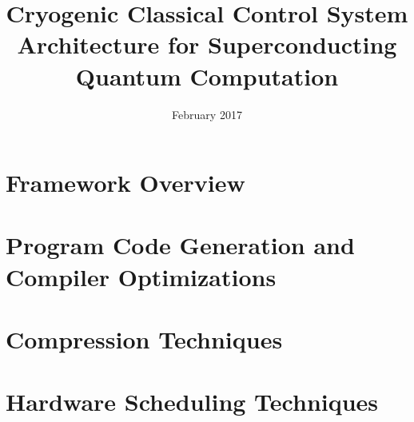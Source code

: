 \documentclass{sig-alternate}
\title{
    {Cryogenic Classical Control System Architecture for Superconducting Quantum Computation}\\
}
\date{February 2017}
\begin{document}
\maketitle
\thispagestyle{firstpage}
\pagestyle{plain}




\begin{abstract}

\end{abstract}

\section{Framework Overview}

\section{Program Code Generation and Compiler Optimizations}

\section{Compression Techniques}
%
\section{Hardware Scheduling Techniques}
%
%





\end{document}
